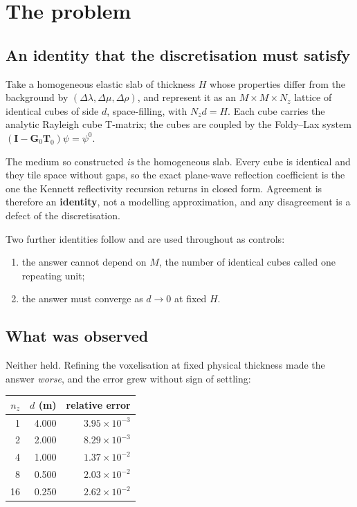\documentclass[11pt,a4paper]{article}
\newcommand{\Dmu}{\Delta\mu}
\newcommand{\Dlam}{\Delta\lambda}
\newcommand{\Drho}{\Delta\rho}
\begin{document}
\tableofcontents

\section{The problem}

\subsection{An identity that the discretisation must satisfy}

Take a homogeneous elastic slab of thickness $H$ whose properties differ from the
background by $(\Dlam,\Dmu,\Drho)$, and represent it as an $M\times M\times N_z$
lattice of identical cubes of side $d$, space-filling, with $N_z d = H$. Each cube
carries the analytic Rayleigh cube T-matrix; the cubes are coupled by the
Foldy--Lax system $(\bm{I}-\bm{G}_0\bm{T}_0)\psi=\psi^0$.

The medium so constructed \emph{is} the homogeneous slab. Every cube is identical
and they tile space without gaps, so the exact plane-wave reflection coefficient
is the one the Kennett reflectivity recursion returns in closed form. Agreement
is therefore an \textbf{identity}, not a modelling approximation, and any
disagreement is a defect of the discretisation.

Two further identities follow and are used throughout as controls:
\begin{enumerate}[nosep]
  \item the answer cannot depend on $M$, the number of identical cubes called one
    repeating unit;
  \item the answer must converge as $d\to0$ at fixed $H$.
\end{enumerate}

\subsection{What was observed}

Neither held. Refining the voxelisation at fixed physical thickness made the
answer \emph{worse}, and the error grew without sign of settling:

\begin{center}
\begin{tabular}{rrr}
\toprule
$n_z$ & $d$ (m) & relative error \\
\midrule
 1 & 4.000 & $3.95\times10^{-3}$ \\
 2 & 2.000 & $8.29\times10^{-3}$ \\
 4 & 1.000 & $1.37\times10^{-2}$ \\
 8 & 0.500 & $2.03\times10^{-2}$ \\
16 & 0.250 & $2.62\times10^{-2}$ \\
\bottomrule
\end{tabular}
\end{center}
\end{document}
